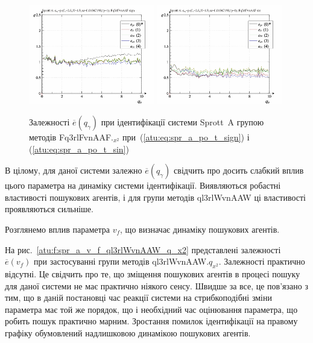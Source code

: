 \begin{figure}[htb!]
  \centerline{
    \includegraphics[width=0.49\textwidth]{p/cha/spr_a/Fq3rlFvnAAF_x2/sprott_a_id-p_q_gamma_sign.png}
    \hfill
    \includegraphics[width=0.49\textwidth]{p/cha/spr_a/Fq3rlFvnAAF_x2/sprott_a_id-p_q_gamma_sin.png}
  }
\caption{Залежності $ \overline{e} (q_\gamma) $ при ідентифікації системи Sprott~A групою методів Fq3rlFvnAAF.$_{x^2} $ при~(\ref{atu:eq:spr_a_po_t_sign}) і (\ref{atu:eq:spr_a_po_t_sin})}
  \label{atu:f:spr_a_qg_Fq3rlFvnAAF_q_x2}
\end{figure}

В цілому, для даної системи залежно
$ \overline{e} (q_\gamma) $ свідчить про досить слабкий вплив цього
параметра на динаміку системи ідентифікації. Виявляються
робастні властивості пошукових агентів, і для групи методів
ql3rlWvnAAW ці властивості проявляються сильніше.


Розглянемо вплив параметра
$ v_f $, що визначає динаміку пошукових агентів.

На рис.~\ref{atu:f:spr_a_v_f_ql3rlWvnAAW_q_x2} представлені залежності
$\overline{e} (v_f) $ при застосуванні групи методів ql3rlWvnAAW.$q_{x^2} $.
Залежності практично відсутні. Це свідчить про те, що зміщення
пошукових агентів в процесі пошуку для даної системи не має
практично ніякого сенсу. Швидше за все, це пов'язано з тим, що в
даній постановці час реакції системи на стрибкоподібні зміни
параметра має той же порядок, що і необхідний час оцінювання
параметра, що робить пошук практично марним. Зростання помилок
ідентифікації на правому графіку обумовлений надлишковою
динамікою пошукових агентів.



